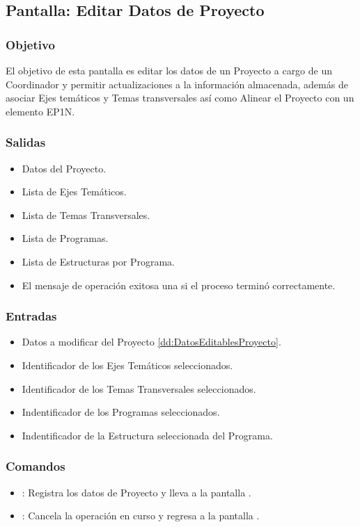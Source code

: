 \subsection{Pantalla: Editar Datos de Proyecto}

\subsubsection{Objetivo}
El objetivo de esta pantalla es editar los datos de un Proyecto a cargo de un Coordinador y permitir actualizaciones a la información almacenada, además de asociar Ejes temáticos y Temas transversales así como Alinear el Proyecto con un elemento EP1N.



\subsubsection{Salidas}
\begin{itemize}
 \item Datos del Proyecto.
 \item Lista de Ejes Temáticos.
 \item Lista de Temas Transversales.
 \item Lista de Programas.
 \item Lista de Estructuras por Programa.
 \item El mensaje de operación exitosa una si el proceso terminó correctamente.
\end{itemize}

\subsubsection{Entradas}
\begin{itemize}
 \item Datos a modificar del Proyecto \ref{dd:DatosEditablesProyecto}.
 \item Identificador de los Ejes Temáticos seleccionados.
 \item Identificador de los Temas Transversales seleccionados.
 \item Indentificador de los Programas seleccionados.
 \item Indentificador de la Estructura seleccionada del Programa.
\end{itemize}

\subsubsection{Comandos}
\begin{itemize}
 \item {}: Registra los datos de Proyecto y lleva a la pantalla .
 \item {}: Cancela la operación en curso y regresa a la pantalla .
\end{itemize}